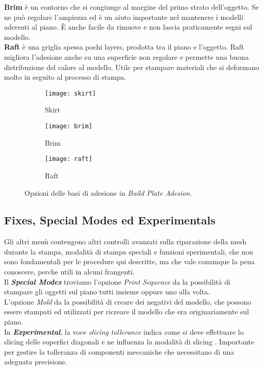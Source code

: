 \textbf{Brim} è un contorno che si congiunge al margine del primo strato dell'oggetto. Se ne può regolare l'ampiezza ed è un aiuto importante nel mantenere i modelli aderenti al piano. È anche facile da rimuove e non lascia praticamente segni sul modello.\\

\textbf{Raft} è una griglia spessa pochi layers, prodotta tra il piano e l'oggetto. Raft migliora l'adesione anche su una superficie non regolare e permette una buona distribuzione del calore al modello. Utile per stampare materiali che si deformano molto in seguito al processo di stampa.
\begin{figure}[h]
 
\begin{subfigure}{0.5\textwidth}
\centering
\texttt{[image: skirt]} 
\caption{Skirt}
\label{fig:skirt}
\end{subfigure}
\begin{subfigure}{0.5\textwidth}
\centering
\texttt{[image: brim]}
\caption{Brim}
\label{fig:brim}
\end{subfigure}
\begin{subfigure}{0.5\textwidth}
\centering
\texttt{[image: raft]}
\caption{Raft}
\label{fig:raft}
\end{subfigure}
 
\caption{Opzioni delle basi di adesione in \emph{Build Plate Adesion}.}
\label{fig:Build Plate Adesion}
\end{figure}

\subsection{Fixes, Special Modes ed Experimentals}
Gli altri menù contengono altri controlli avanzati sulla riparazione della mesh durante la stampa, modalità di stampa speciali e funzioni sperimentali, che non sono fondamentali per le procedure qui descritte, ma che vale comunque la pena conoscere, perche utili in alcuni frangenti.\\
Il \emph{\textbf{Special Modes}} troviamo l'opzione \emph{Print Sequence} da la possibilità di stampare gli oggetti sul piano tutti insieme oppure uno alla volta. \\
L'opzione \emph{Mold} da la possibilità di creare dei negativi del modello, che possono essere stampati ed utilizzati per ricreare il modello che era originariamente sul piano.\\
In \emph{\textbf{Experimental}}, la voce \emph{slicing tollerance} indica come si deve effettuare lo slicing delle superfici diagonali e ne influenza la modalità di slicing \parencite{Reference56}. Importante per gestire la tolleranza di componenti meccaniche che necessitano di una adeguata precisione.
